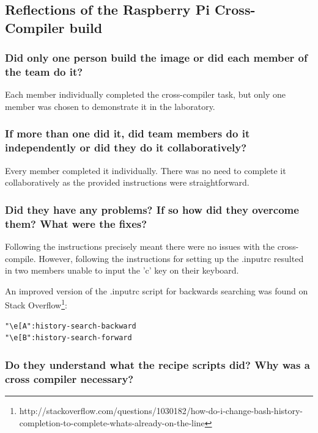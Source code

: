 \documentclass[11pt,a4paper,titlepage]{report}
\begin{document}
\begin{appendices}
\chapter{Reflections of the Raspberry Pi Cross-Compiler build}

\subsection*{Did only one person build the image or did each member of the team do it?}

Each member individually completed the cross-compiler task, but only one member was chosen to demonstrate it in the laboratory.

\subsection*{If more than one did it, did team members do it independently or did they do it 
collaboratively?}

Every member completed it individually. There was no need to complete it collaboratively as the provided instructions were straightforward.

\subsection*{Did they have any problems? If so how did they overcome them? What were 
the fixes?}

Following the instructions precisely meant there were no issues with the cross-compile. However, following the instructions for setting up the .inputrc resulted in two members unable to input the 'c' key on their keyboard.

An improved version of the .inputrc script for backwards searching was found on Stack Overflow\footnote{http://stackoverflow.com/questions/1030182/how-do-i-change-bash-history-completion-to-complete-whats-already-on-the-line}:

\begin{lstlisting}[frame=single]
"\e[A":history-search-backward
"\e[B":history-search-forward
\end{lstlisting}

\subsection*{Do they understand what the recipe scripts did? Why was a cross compiler 
necessary?}


\end{appendices}
\end{document}

